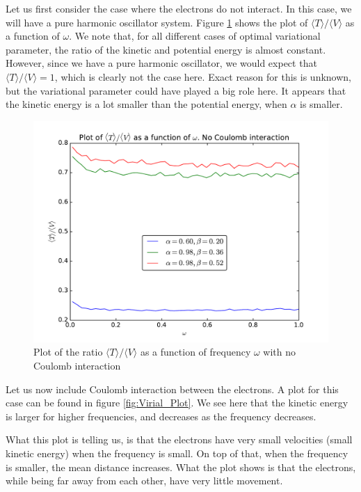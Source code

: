 \documentclass[12pt]{article}
\begin{document}
Let us first consider the case where the electrons do not interact. In this case, we will have a pure harmonic oscillator system. Figure \ref{fig:Virial_NoCoulomb} shows the plot of $\langle T \rangle / \langle V \rangle$ as a function of $\omega$. We note that, for all different cases of optimal variational parameter, the ratio of the kinetic and potential energy is almost constant. However, since we have a pure harmonic oscillator, we would expect that $\langle T \rangle / \langle V \rangle = 1$, which is clearly not the case here. Exact reason for this is unknown, but the variational parameter could have played a big role here. It appears that the kinetic energy is a lot smaller than the potential energy, when $\alpha$ is smaller.
\begin{figure}[h]
\centering
\includegraphics[width=\linewidth]{Plots/Virial_Plot_NoCoulombInt.pdf}
\caption{Plot of the ratio $\langle T \rangle / \langle V \rangle$ as a function of frequency $\omega$ with no Coulomb interaction}
\label{fig:Virial_NoCoulomb}
\end{figure}


Let us now include Coulomb interaction between the electrons. A plot for this case can be found in figure \ref{fig:Virial_Plot}. We see here that the kinetic energy is larger for higher frequencies, and decreases as the frequency decreases. 

What this plot is telling us, is that the electrons have very small velocities (small kinetic energy) when the frequency is small. On top of that, when the frequency is smaller, the mean distance increases. What the plot shows is that the electrons, while being far away from each other, have very little movement. 
\end{document}

